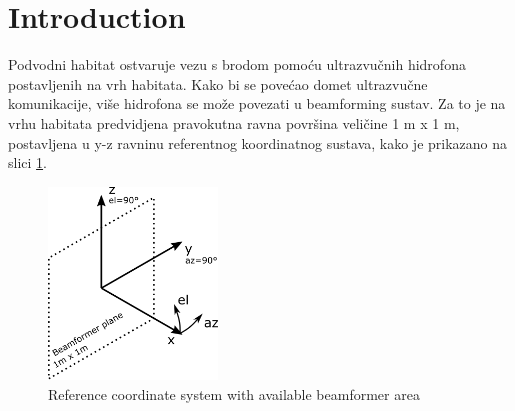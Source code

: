 \documentclass{article}[a4paper]
\begin{document}
\section*{Introduction}

Podvodni habitat ostvaruje vezu s brodom pomoću ultrazvučnih hidrofona postavljenih na vrh habitata. Kako bi se povećao domet ultrazvučne komunikacije, više hidrofona se može povezati u beamforming sustav. Za to je na vrhu habitata predvidjena pravokutna ravna površina veličine 1 m x 1 m, postavljena u y-z ravninu referentnog koordinatnog sustava, kako je prikazano na slici \ref{fig:coord}.
\begin{figure}[h!]
   \centering
   \includegraphics[width=0.4\textwidth]{coord.png}
   \caption{Reference coordinate system with available beamformer area}
   \label{fig:coord}
\end{figure}
\end{document}
